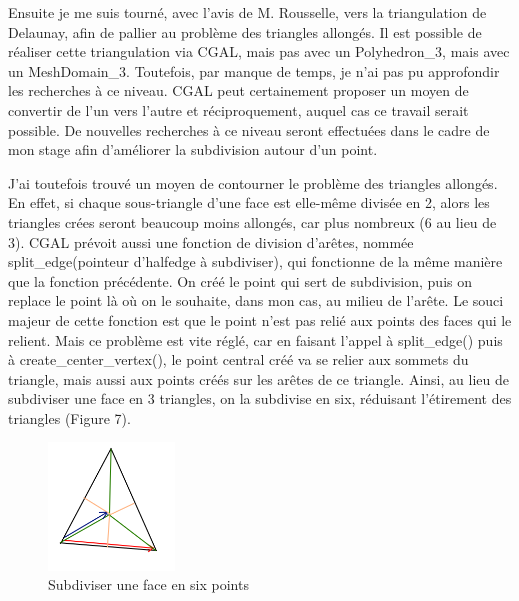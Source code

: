 \documentclass[a4paper,french]{report}
\begin{document}
					Ensuite je me suis tourné, avec l'avis de M. Rousselle, vers la triangulation de Delaunay, afin de pallier au problème des triangles allongés. Il est possible de réaliser cette triangulation via CGAL, mais pas avec un Polyhedron\_3, mais avec un MeshDomain\_3. Toutefois, par manque de temps, je n'ai pas pu approfondir les recherches à ce niveau. CGAL peut certainement proposer un moyen de convertir de l'un vers l'autre et réciproquement, auquel cas ce travail serait possible. De nouvelles recherches à ce niveau seront effectuées dans le cadre de mon stage afin d'améliorer la subdivision autour d'un point. \par
					J'ai toutefois trouvé un moyen de contourner le problème des triangles allongés. En effet, si chaque sous-triangle d'une face est elle-même divisée en 2, alors les triangles crées seront beaucoup moins allongés, car plus nombreux (6 au lieu de 3). CGAL prévoit aussi une fonction de division d'arêtes, nommée split\_edge(pointeur d'halfedge à subdiviser), qui fonctionne de la même manière que la fonction précédente. On créé le point qui sert de subdivision, puis on replace le point là où on le souhaite, dans mon cas, au milieu de l'arête. Le souci majeur de cette fonction est que le point n'est pas relié aux points des faces qui le relient. Mais ce problème est vite réglé, car en faisant l'appel à split\_edge() puis à create\_center\_vertex(), le point central créé va se relier aux sommets du triangle, mais aussi aux points créés sur les arêtes de ce triangle. Ainsi, au lieu de subdiviser une face en 3 triangles, on la subdivise en six, réduisant l'étirement des triangles (Figure 7). 
					\begin{figure}[h]
						\centering
						\includegraphics[width=0.3\textwidth]{FigBarycentricMeshSplit.png}
						\caption{Subdiviser une face en six points}
					\end{figure}
\end{document}
